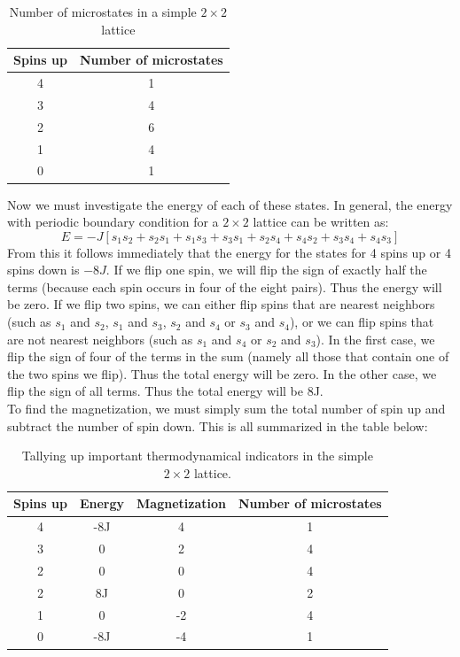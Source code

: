 \documentclass[a4paper, 10pt]{article}
\begin{document}
\begin{table}
\centering
\caption{Number of microstates in a simple $2 \times 2$ lattice}
\begin{tabular}{|c|c|}
\hline
Spins up & Number of microstates\\
\hline
4 & 1\\
3 & 4\\
2 & 6\\
1 & 4\\
0 & 1\\
\hline
\end{tabular}
\end{table}
Now we must investigate the energy of each of these states. In general, the energy with periodic boundary condition for a $2\times 2$ lattice can be written as:
$$E=-J\left[s_1s_2+s_2s_1+s_1s_3+s_3s_1+s_2s_4+s_4s_2+s_3s_4+s_4s_3\right]$$
From this it follows immediately that the energy for the states for 4 spins up or 4 spins down is $-8J$. If we flip one spin, we will flip the sign of exactly half the terms (because each spin occurs in four of the eight pairs). Thus the energy will be zero. If we flip two spins, we can either flip spins that are nearest neighbors (such as $s_1$ and $s_2$, $s_1$ and $s_3$, $s_2$ and $s_4$ or $s_3$ and $s_4$), or we can flip spins that are not nearest neighbors (such as $s_1$ and $s_4$ or $s_2$ and $s_3$). In the first case, we flip the sign of four of the terms in the sum (namely all those that contain one of the two  spins we flip). Thus the total energy will be zero. In the other case, we flip the sign of all terms. Thus the total energy will be 8J.\\
\linebreak
To find the magnetization, we must simply sum the total number of spin up and subtract the number of spin down. This is all summarized in the table below:
\begin{table}
\centering
\caption{Tallying up important thermodynamical indicators in the simple $2 \times 2$ lattice.}
\begin{tabular}{|c|c|c|c|}
\hline
Spins up &  Energy & Magnetization &Number of microstates\\
\hline
4 &-8J&4&1\\
3 &0 & 2 & 4\\
2 &0 &0 & 4\\
2 & 8J & 0 &2\\
1 &0&-2 & 4\\
0 & -8J & -4& 1\\
\hline
\end{tabular}
\end{table}
\end{document}
